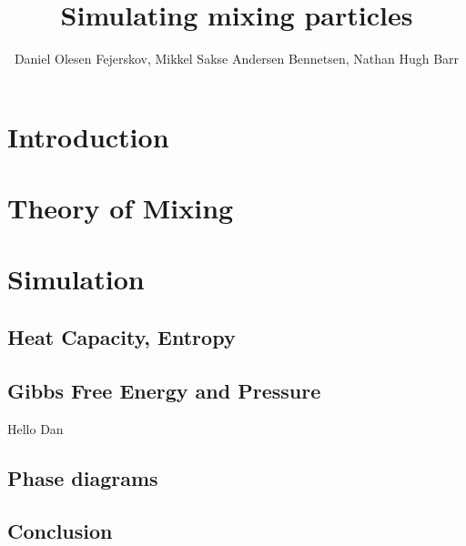 \documentclass[12pt,a4paper]{report}
\begin{document}
\title{Simulating mixing particles}
\author{Daniel Olesen Fejerskov, Mikkel Sakse Andersen Bennetsen, Nathan Hugh Barr}
\maketitle
\tableofcontents

\chapter{Introduction}


\chapter{Theory of Mixing}


\chapter{Simulation}


\section{Heat Capacity, Entropy}


\section{Gibbs Free Energy and Pressure}
Hello Dan


\section{Phase diagrams}


\section{Conclusion}
\end{document}
